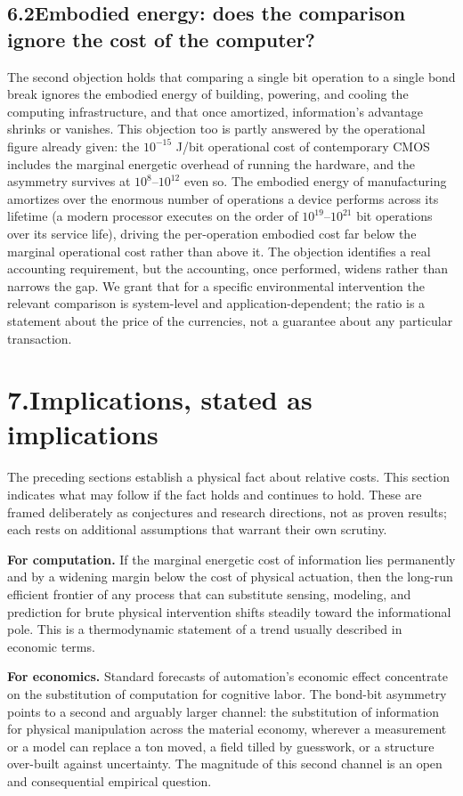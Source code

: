 \documentclass[11pt]{article}
\begin{document}
\subsection*{6.2\quad Embodied energy: does the comparison ignore the cost of the computer?}
The second objection holds that comparing a single bit operation to a single bond break ignores the embodied energy of building, powering, and cooling the computing infrastructure, and that once amortized, information's advantage shrinks or vanishes. This objection too is partly answered by the operational figure already given: the $10^{-15}$ J/bit operational cost of contemporary CMOS includes the marginal energetic overhead of running the hardware, and the asymmetry survives at $10^{8}$--$10^{12}$ even so. The embodied energy of manufacturing amortizes over the enormous number of operations a device performs across its lifetime (a modern processor executes on the order of $10^{19}$--$10^{21}$ bit operations over its service life), driving the per-operation embodied cost far below the marginal operational cost rather than above it. The objection identifies a real accounting requirement, but the accounting, once performed, widens rather than narrows the gap. We grant that for a specific environmental intervention the relevant comparison is system-level and application-dependent; the ratio is a statement about the price of the currencies, not a guarantee about any particular transaction.

\section*{7.\quad Implications, stated as implications}
The preceding sections establish a physical fact about relative costs. This section indicates what may follow if the fact holds and continues to hold. These are framed deliberately as conjectures and research directions, not as proven results; each rests on additional assumptions that warrant their own scrutiny.

\textbf{For computation.} If the marginal energetic cost of information lies permanently and by a widening margin below the cost of physical actuation, then the long-run efficient frontier of any process that can substitute sensing, modeling, and prediction for brute physical intervention shifts steadily toward the informational pole. This is a thermodynamic statement of a trend usually described in economic terms.

\textbf{For economics.} Standard forecasts of automation's economic effect concentrate on the substitution of computation for cognitive labor. The bond-bit asymmetry points to a second and arguably larger channel: the substitution of information for physical manipulation across the material economy, wherever a measurement or a model can replace a ton moved, a field tilled by guesswork, or a structure over-built against uncertainty. The magnitude of this second channel is an open and consequential empirical question.
\end{document}
